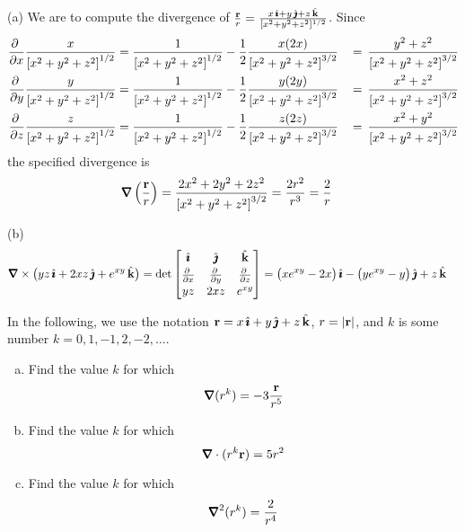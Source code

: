 \begin{solution} (a)
 We are to compute the divergence of $\frac{\mathbf{r}}{r}
=\frac{x\,\hat{\pmb{\imath}}+y\,\hat{\pmb{\jmath}}+z\,\hat{\mathbf{k}}}{[x^2+y^2+z^2]^{1/2}}$. Since
\begin{alignat*}{3}
\pdiff{}{x}\frac{x}{{[x^2+y^2+z^2]}^{1/2}}
&=\frac{1}{{[x^2+y^2+z^2]}^{1/2}} 
            -\frac{1}{2}\frac{x(2x)}{{[x^2+y^2+z^2]}^{3/2}}
&\,=\,\frac{y^2+z^2}{{[x^2+y^2+z^2]}^{3/2}}
\\
\pdiff{}{y}\frac{y}{{[x^2+y^2+z^2]}^{1/2}}
&=\frac{1}{{[x^2+y^2+z^2]}^{1/2}} 
            -\frac{1}{2}\frac{y(2y)}{{[x^2+y^2+z^2]}^{3/2}}
&\,=\,\frac{x^2+z^2}{{[x^2+y^2+z^2]}^{3/2}}
\\
\pdiff{}{z}\frac{z}{{[x^2+y^2+z^2]}^{1/2}}
&=\frac{1}{{[x^2+y^2+z^2]}^{1/2}} 
            -\frac{1}{2}\frac{z(2z)}{{[x^2+y^2+z^2]}^{3/2}}
&\,=\,\frac{x^2+y^2}{{[x^2+y^2+z^2]}^{3/2}}
\end{alignat*}
the specified divergence is
\begin{align*}
\vnabla\left(\frac{\vr}{r}\right) &= \frac{2x^2+2y^2+2z^2}{{[x^2+y^2+z^2]}^{3/2}}
                               =\frac{2r^2}{r^3}
                               =\frac{2}{r}
\end{align*}

(b)
\begin{align*}
\vnabla\times\big(yz\,\hi + 2xz\,\hj + e^{xy}\,\hk\big)
&=\det\left[\begin{matrix}\hi&\hj&\hk\\[0.03in] 
     \pdiff{}{x}&
        \pdiff{}{y}&
        \pdiff{}{z}\\[0.03in]
yz&2xz&e^{xy}\end{matrix}\right]
=\big(xe^{xy}-2x\big)\,\hi-\big(ye^{xy}-y\big)\,\hj+z\,\hk
\end{align*}

\end{solution}


\begin{question}[M317 2008A]\label{poisson} %
In the following, we use the notation 
$\mathbf{r} = x\,\hat{\pmb{\imath}} + y\,\hat{\pmb{\jmath}} + z\,\hat{\mathbf{k}}$, $r = |\mathbf{r}|$, and $k$ is some number
$k = 0, 1, -1, 2, -2, \dots$.
\begin{enumerate}[(a)]
\item
Find the value $k$ for which
\begin{equation*}
\vnabla (r^k) = -3\frac{\vr}{r^5}
\end{equation*}
\item
Find the value $k$ for which
\begin{equation*}
\vnabla  \cdot (r^k\vr) = 5r^2 
\end{equation*}
\item
Find the value $k$ for which
\begin{equation*}
\vnabla^2 (r^k) = \frac{2}{r^4}
\end{equation*}
\end{enumerate}
\end{question}

